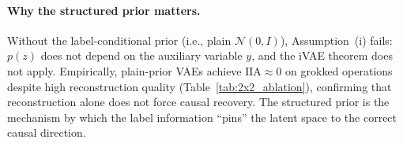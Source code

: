 \paragraph{Why the structured prior matters.}
Without the label-conditional prior (i.e., plain $\mathcal{N}(0,I)$),
Assumption~(i) fails: $p(z)$ does not depend on the auxiliary variable $y$,
and the iVAE theorem does not apply.  Empirically, plain-prior VAEs achieve
$\text{IIA} \approx 0$ on grokked operations despite high reconstruction
quality (Table~\ref{tab:2x2_ablation}), confirming that reconstruction alone
does not force causal recovery.  The structured prior is the mechanism by
which the label information ``pins'' the latent space to the correct
causal direction.



